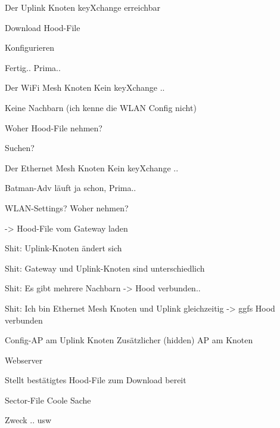 \begin{frame}{Der Uplink Knoten}
    keyXchange erreichbar

    Download Hood-File

    Konfigurieren

    Fertig.. Prima..
\end{frame}

\begin{frame}{Der WiFi Mesh Knoten}
    Kein keyXchange ..

    Keine Nachbarn (ich kenne die WLAN Config nicht)

    Woher Hood-File nehmen?

    Suchen?
\end{frame}

\begin{frame}{Der Ethernet Mesh Knoten}
    Kein keyXchange ..

    Batman-Adv läuft ja schon, Prima..

    WLAN-Settings? Woher nehmen?
    
    -> Hood-File vom Gateway laden

    Shit: Uplink-Knoten ändert sich

    Shit: Gateway und Uplink-Knoten sind unterschiedlich

    Shit: Es gibt mehrere Nachbarn -> Hood verbunden..

    Shit: Ich bin Ethernet Mesh Knoten und Uplink gleichzeitig -> ggfs Hood verbunden
\end{frame}

\begin{frame}{Config-AP am Uplink Knoten}
    Zusätzlicher (hidden) AP am Knoten

    Webserver

    Stellt bestätigtes Hood-File zum Download bereit
\end{frame}

\begin{frame}{Sector-File}
    Coole Sache

    Zweck .. usw
\end{frame}
